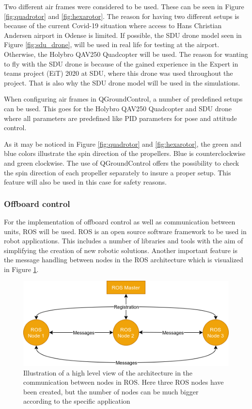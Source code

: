 \documentclass[../Head/report.tex]{subfiles}
\begin{document}
Two different air frames were considered to be used. These can be seen in Figure \ref{fig:quadrotor} and \ref{fig:hexarotor}. The reason for having two different setups is because of the current Covid-19 situation where access to Hans Christian Andersen airport in Odense is limited. If possible, the SDU drone model seen in Figure \ref{fig:sdu_drone}, will be used in real life for testing at the airport. Otherwise, the Holybro QAV250 Quadcopter will be used. The reason for wanting to fly with the SDU drone is because of the gained experience in the Expert in teams project (EiT) 2020 at SDU, where this drone was used throughout the project. That is also why the SDU drone model will be used in the simulations. 

When configuring air frames in QGroundControl, a number of predefined setups can be used. This goes for the Holybro QAV250 Quadcopter and SDU drone where all parameters are predefined like PID parameters for pose and attitude control.

As it may be noticed in Figure \ref{fig:quadrotor} and \ref{fig:hexarotor}, the green and blue colors illustrate the spin direction of the propellers. Blue is counterclockwise and green clockwise. The use of QGroundControl offers the possibility to check the spin direction of each propeller separately to insure a proper setup. This feature will also be used in this case for safety reasons.  

 
\subsubsection{Offboard control}
\label{sec:offboard_control}

For the implementation of offboard control as well as communication between units, ROS will be used. ROS is an open source software framework to be used in robot applications. This includes a number of libraries and tools with the aim of simplifying the creation of new robotic solutions. Another important feature is the message handling between nodes in the ROS architecture which is visualized in Figure \ref{fig:ros}.

\begin{figure}[H]
    \centering
    \includegraphics[width=0.75\linewidth]{../Figures/ros.png}
    \caption{Illustration of a high level view of the architecture in the communication between nodes in ROS. Here three ROS nodes have been created, but the number of nodes can be much bigger according to the specific application}
    \label{fig:ros}
\end{figure}
\end{document}
